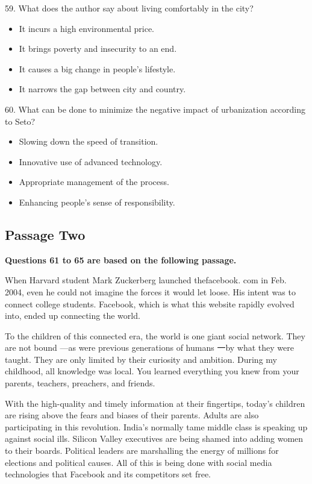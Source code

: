 \documentclass[UTF8,11pt]{ctexart}
\begin{document}
59. What does the author say about living comfortably in the city?


\begin{itemize}[leftmargin=2em,itemsep=.2em,topsep=.4em]\item[A.] It incurs a high environmental price.
\item[B.] It brings poverty and insecurity to an end.
\item[C.] It causes a big change in people’s lifestyle.
\item[D.] It narrows the gap between city and country.
\end{itemize}

60. What can be done to minimize the negative impact of urbanization according to Seto?


\begin{itemize}[leftmargin=2em,itemsep=.2em,topsep=.4em]\item[A.] Slowing down the speed of transition.
\item[B.] Innovative use of advanced technology.
\item[C.] Appropriate management of the process.
\item[D.] Enhancing people’s sense of responsibility.
\end{itemize}

\subsection*{\textbf{Passage Two}}


\textbf{Questions 61 to 65 are based on the following passage.}


When Harvard student Mark Zuckerberg launched thefacebook. com in Feb. 2004, even he could not imagine the forces it would let loose. His intent was to connect college students. Facebook, which is what this website rapidly evolved into, ended up connecting the world.


To the children of this connected era, the world is one giant social network. They are not bound —as were previous generations of humans 一by what they were taught. They are only limited by their curiosity and ambition. During my childhood, all knowledge was local. You learned everything you knew from your parents, teachers, preachers, and friends.


With the high-quality and timely information at their fingertips, today’s children are rising above the fears and biases of their parents. Adults are also participating in this revolution. India’s normally tame middle class is speaking up against social ills. Silicon Valley executives are being shamed into adding women to their boards. Political leaders are marshalling the energy of millions for elections and political causes. All of this is being done with social media technologies that Facebook and its competitors set free.
\end{document}
